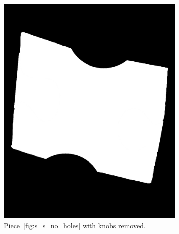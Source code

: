 \documentclass{article}
\begin{document}
\begin{figure}
\begin{subfigure}{0.3\textwidth}
    \includegraphics[width=\linewidth]{pictures/piece_with_no_knobs.png}
    \caption{Piece~\ref{fig:s_s_no_holes} with knobs removed.}
    \label{fig:s_s_no_knobs}
  \end{subfigure}
  \hfill
  \begin{subfigure}{0.3\textwidth}
    \centering

\end{subfigure}
\end{figure}
\end{document}

